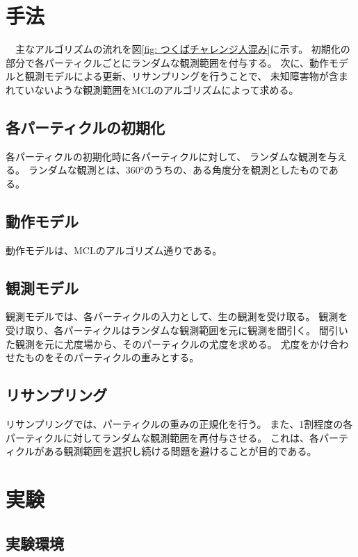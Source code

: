 \documentclass{jarticle}
\begin{document}
\section{手法}%

　主なアルゴリズムの流れを図\ref{fig: つくばチャレンジ人混み}に示す。
初期化の部分で各パーティクルごとにランダムな観測範囲を付与する。
次に、動作モデルと観測モデルによる更新、リサンプリングを行うことで、
未知障害物が含まれていないような観測範囲をMCLのアルゴリズムによって求める。


\subsection{各パーティクルの初期化}

各パーティクルの初期化時に各パーティクルに対して、
ランダムな観測を与える。
ランダムな観測とは、360°のうちの、ある角度分を観測としたものである。

\subsection{動作モデル}

動作モデルは、MCLのアルゴリズム通りである。

\subsection{観測モデル}

観測モデルでは、各パーティクルの入力として、生の観測を受け取る。
観測を受け取り、各パーティクルはランダムな観測範囲を元に観測を間引く。
間引いた観測を元に尤度場から、そのパーティクルの尤度を求める。
尤度をかけ合わせたものをそのパーティクルの重みとする。

\subsection{リサンプリング}

リサンプリングでは、パーティクルの重みの正規化を行う。
また、1割程度の各パーティクルに対してランダムな観測範囲を再付与させる。
これは、各パーティクルがある観測範囲を選択し続ける問題を避けることが目的である。

\section{実験}%

\subsection{実験環境}
\end{document}
